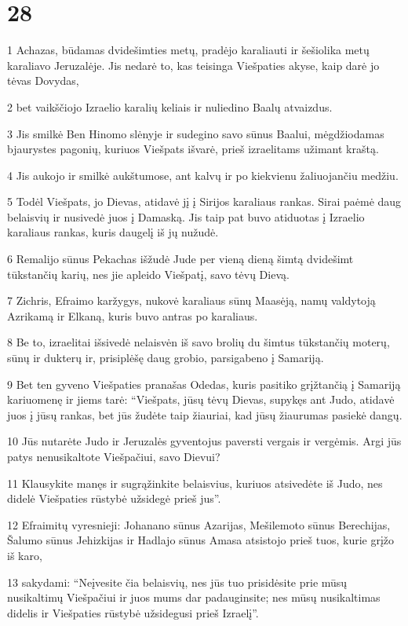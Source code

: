 \chapter{28}


\par 1 Achazas, būdamas dvidešimties metų, pradėjo karaliauti ir šešiolika metų karaliavo Jeruzalėje. Jis nedarė to, kas teisinga Viešpaties akyse, kaip darė jo tėvas Dovydas, 
\par 2 bet vaikščiojo Izraelio karalių keliais ir nuliedino Baalų atvaizdus. 
\par 3 Jis smilkė Ben Hinomo slėnyje ir sudegino savo sūnus Baalui, mėgdžiodamas bjaurystes pagonių, kuriuos Viešpats išvarė, prieš izraelitams užimant kraštą. 
\par 4 Jis aukojo ir smilkė aukštumose, ant kalvų ir po kiekvienu žaliuojančiu medžiu. 
\par 5 Todėl Viešpats, jo Dievas, atidavė jį į Sirijos karaliaus rankas. Sirai paėmė daug belaisvių ir nusivedė juos į Damaską. Jis taip pat buvo atiduotas į Izraelio karaliaus rankas, kuris daugelį iš jų nužudė. 
\par 6 Remalijo sūnus Pekachas išžudė Jude per vieną dieną šimtą dvidešimt tūkstančių karių, nes jie apleido Viešpatį, savo tėvų Dievą. 
\par 7 Zichris, Efraimo karžygys, nukovė karaliaus sūnų Maasėją, namų valdytoją Azrikamą ir Elkaną, kuris buvo antras po karaliaus. 
\par 8 Be to, izraelitai išsivedė nelaisvėn iš savo brolių du šimtus tūkstančių moterų, sūnų ir dukterų ir, prisiplėšę daug grobio, parsigabeno į Samariją. 
\par 9 Bet ten gyveno Viešpaties pranašas Odedas, kuris pasitiko grįžtančią į Samariją kariuomenę ir jiems tarė: “Viešpats, jūsų tėvų Dievas, supykęs ant Judo, atidavė juos į jūsų rankas, bet jūs žudėte taip žiauriai, kad jūsų žiaurumas pasiekė dangų. 
\par 10 Jūs nutarėte Judo ir Jeruzalės gyventojus paversti vergais ir vergėmis. Argi jūs patys nenusikaltote Viešpačiui, savo Dievui? 
\par 11 Klausykite manęs ir sugrąžinkite belaisvius, kuriuos atsivedėte iš Judo, nes didelė Viešpaties rūstybė užsidegė prieš jus”. 
\par 12 Efraimitų vyresnieji: Johanano sūnus Azarijas, Mešilemoto sūnus Berechijas, Šalumo sūnus Jehizkijas ir Hadlajo sūnus Amasa atsistojo prieš tuos, kurie grįžo iš karo, 
\par 13 sakydami: “Neįvesite čia belaisvių, nes jūs tuo prisidėsite prie mūsų nusikaltimų Viešpačiui ir juos mums dar padauginsite; nes mūsų nusikaltimas didelis ir Viešpaties rūstybė užsidegusi prieš Izraelį”. 
